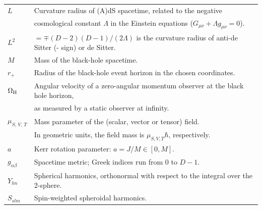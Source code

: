 \documentclass[11pt]{article}
\numberwithin{equation}{section} %
\begin{document}
\begin{table}[ht]
\begin{tabular}{ll}
  $L$                   & Curvature radius of (A)dS spacetime, related to the negative \\
                        & cosmological constant $\Lambda$ in the Einstein equations ($G_{\mu\nu}+\Lambda g_{\mu\nu}=0$).\\
  $L^2$                 &$=\mp(D-2)(D-1)/(2\Lambda)$ is the curvature radius of anti-de Sitter (- sign) or de Sitter.\\
  $M$                   & Mass of the black-hole spacetime. \\
  $r_+$                 & Radius of the black-hole event horizon in the chosen coordinates.\\
  $\Omega_{\rm H}$      & Angular velocity of a zero-angular momentum observer at the black hole horizon,\\
			& as measured by a static observer at infinity.\\
 $\mu_{S,\,V,\,T}$      & Mass parameter of the (scalar, vector or tensor) field. \\
			& In geometric units, the field mass is $\mu_{S,V,T}\hbar$, respectively.\\
  $a$                   & Kerr rotation parameter: $a = J/M \in [0,M]$.\\
  $g_{\alpha \beta}$    & Spacetime metric; Greek indices run from 0 to $D-1$. \\
  $Y_{lm}$		& Spherical harmonics, orthonormal with respect to the integral over the 2-sphere.\\
  $S_{slm}$		& Spin-weighted spheroidal harmonics. 

\end{tabular}
\end{table}
%




\clearpage
\newpage
\end{document}
